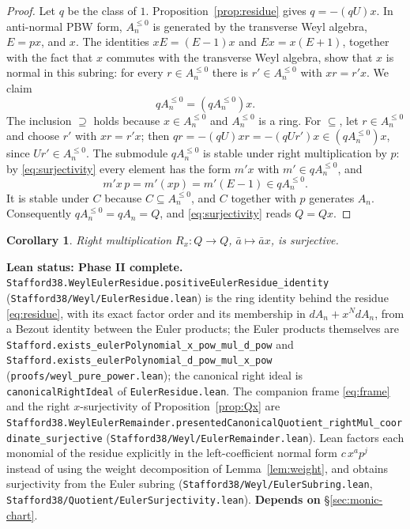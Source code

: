 \documentclass[11pt]{article}
\theoremstyle{plain}
\newtheorem{corollary}[theorem]{Corollary}
\theoremstyle{definition}
\theoremstyle{remark}
\theoremstyle{plain}
\begin{document}
\begin{proof}
Let $q$ be the class of $1$. Proposition~\ref{prop:residue} gives
$q=-(qU)x$. In anti-normal PBW form, $A_n^{\leq0}$ is generated by the
transverse Weyl algebra, $E=px$, and $x$. The identities $xE=(E-1)x$ and
$Ex=x(E+1)$, together with the fact that $x$ commutes with the transverse
Weyl algebra, show that $x$ is normal in this subring: for every
$r\in A_n^{\leq0}$ there is $r'\in A_n^{\leq0}$ with $xr=r'x$. We claim
\begin{equation}
 qA_n^{\leq0}=(qA_n^{\leq0})x .
 \label{eq:surjectivity}
\end{equation}
The inclusion $\supseteq$ holds because $x\in A_n^{\leq0}$ and
$A_n^{\leq0}$ is a ring. For $\subseteq$, let $r\in A_n^{\leq0}$ and choose
$r'$ with $xr=r'x$; then $qr=-(qU)xr=-(qUr')x\in(qA_n^{\leq0})x$, since
$Ur'\in A_n^{\leq0}$.
The submodule $qA_n^{\leq0}$ is stable under right multiplication by $p$:
by \eqref{eq:surjectivity} every element has the form $m'x$ with
$m'\in qA_n^{\leq0}$, and
\[
 m'x\,p=m'(xp)=m'(E-1)\in qA_n^{\leq0}.
\]
It is stable under $C$ because $C\subseteq A_n^{\leq0}$, and $C$ together
with $p$ generates $A_n$. Consequently $qA_n^{\leq0}=qA_n=Q$, and
\eqref{eq:surjectivity} reads $Q=Qx$.
\end{proof}

\begin{corollary}\label{cor:Qx}
Right multiplication $R_x\colon Q\to Q$, $\bar a\mapsto\bar ax$, is surjective.
\end{corollary}

\begin{provbox}
\textbf{Lean status: Phase II complete.}
\texttt{Stafford38.\allowbreak WeylEulerResidue.\allowbreak positiveEulerResidue\_identity}
(\texttt{Stafford38/Weyl/EulerResidue.lean}) is the ring identity behind the
residue \eqref{eq:residue}, with its exact factor order and its membership in
$dA_n+x^NdA_n$, from a Bezout identity between the Euler products; the Euler
products themselves are \texttt{Stafford.exists\_eulerPolynomial\_x\_pow\_mul\_d\_pow}
and \texttt{Stafford.exists\_eulerPolynomial\_d\_pow\_mul\_x\_pow}
(\texttt{proofs/weyl\_pure\_power.lean}); the canonical right ideal is
\texttt{canonicalRightIdeal} of \texttt{EulerResidue.lean}. The companion frame
\eqref{eq:frame} and the right $x$-surjectivity of Proposition~\ref{prop:Qx}
are
\texttt{Stafford38.\allowbreak WeylEulerRemainder.\allowbreak presentedCanonicalQuotient\_rightMul\_coordinate\_surjective}
(\texttt{Stafford38/Weyl/EulerRemainder.lean}). Lean factors each monomial of
the residue explicitly in the left-coefficient normal form $c\,x^ap^j$ instead
of using the weight decomposition of Lemma~\ref{lem:weight}, and obtains
surjectivity from the Euler subring
(\texttt{Stafford38/Weyl/EulerSubring.lean},
\texttt{Stafford38/Quotient/EulerSurjectivity.lean}).
\textbf{Depends on} \S\ref{sec:monic-chart}.
\end{provbox}
\end{document}
